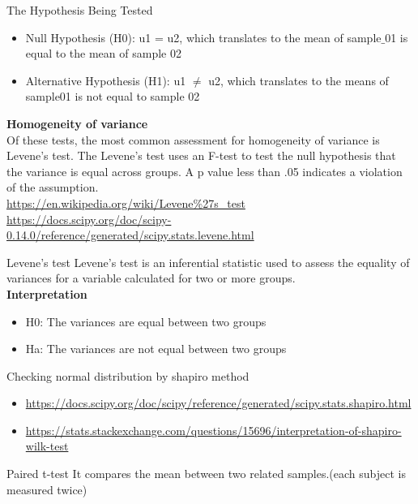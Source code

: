 \begin{frame}[t]{The Hypothesis Being Tested}
	\begin{itemize}
		\item Null Hypothesis (H0): u1 = u2, which translates to the mean of sample$\_$01 is equal to the mean of sample 02
		\item Alternative Hypothesis (H1): u1 $\neq$ u2, which translates to the means of sample01 is not equal to sample 02
	\end{itemize}
	\textbf{Homogeneity of variance} \\
	Of these tests, the most common assessment for homogeneity of variance is Levene's test. The Levene's test uses an F-test to test the null hypothesis that the variance is equal across groups. A p value less than .05 indicates a violation of the assumption. \\
	\url{https://en.wikipedia.org/wiki/Levene\%27s_test} \\
	\url{https://docs.scipy.org/doc/scipy-0.14.0/reference/generated/scipy.stats.levene.html}
\end{frame}
\begin{frame}[t]{Levene's test}
	Levene's test is an inferential statistic used to assess the equality of variances for a variable calculated for two or more groups. \\
	\textbf{Interpretation}
	\begin{itemize}
		\item H0: The variances are equal between two groups
		\item Ha: The variances are not equal between two groups
	\end{itemize}
\end{frame}

\begin{frame}[t]{Checking normal distribution by shapiro method}
	\begin{itemize}
		\item \url{https://docs.scipy.org/doc/scipy/reference/generated/scipy.stats.shapiro.html}
		\item \url{https://stats.stackexchange.com/questions/15696/interpretation-of-shapiro-wilk-test}
	\end{itemize}
\end{frame}
\begin{frame}[t]{Paired t-test}
	It compares the mean between two related samples.(each subject is measured twice)
\end{frame}

